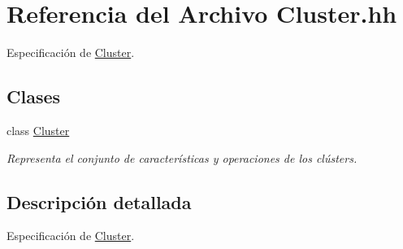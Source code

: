 \hypertarget{_cluster_8hh}{}\section{Referencia del Archivo Cluster.\+hh}
\label{_cluster_8hh}


Especificación de \hyperlink{class_cluster}{Cluster}.  


\subsection*{Clases}
\begin{DoxyCompactItemize}
\item 
class \hyperlink{class_cluster}{Cluster}
\begin{DoxyCompactList}\small\item\em Representa el conjunto de características y operaciones de los clústers. \end{DoxyCompactList}\end{DoxyCompactItemize}


\subsection{Descripción detallada}
Especificación de \hyperlink{class_cluster}{Cluster}. 

